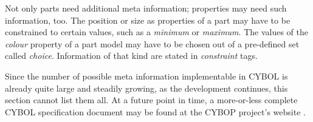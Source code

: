 Not only parts need additional meta information; properties may need such
information, too. The position or size as properties of a part may have to be
constrained to certain values, such as a \emph{minimum} or \emph{maximum}. The
values of the \emph{colour} property of a part model may have to be chosen out
of a pre-defined set called \emph{choice}. Information of that kind are stated
in \emph{constraint} tags.

Since the number of possible meta information implementable in CYBOL is already
quite large and steadily growing, as the development continues, this section
cannot list them all. At a future point in time, a more-or-less complete CYBOL
specification document may be found at the CYBOP project's website \cite{cybop}.
